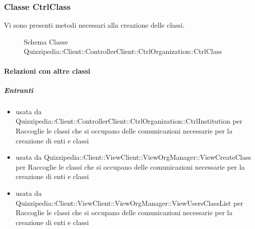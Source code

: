 \subsubsection{Classe CtrlClass}
Vi sono presenti metodi necessari alla creazione delle classi.
\begin{figure}[H]
\centering
\noindent{}
\caption[Schema Classe CtrlClass]{Schema Classe Quizzipedia::Client::ControllerClient::CtrlOrganization::CtrlClass}
\end{figure}
\paragraph{Relazioni con altre classi}
\subparagraph{Entranti}
\begin{itemize}
\item usata da Quizzipedia::Client::ControllerClient::CtrlOrganization::CtrlInstitution per Raccoglie le classi che si occupano delle comunicazioni necessarie per la creazione di enti e classi
\item usata da Quizzipedia::Client::ViewClient::ViewOrgManager::ViewCreateClass per Raccoglie le classi che si occupano delle comunicazioni necessarie per la creazione di enti e classi
\item usata da Quizzipedia::Client::ViewClient::ViewOrgManager::ViewUsersClassList per Raccoglie le classi che si occupano delle comunicazioni necessarie per la creazione di enti e classi
\end{itemize}
